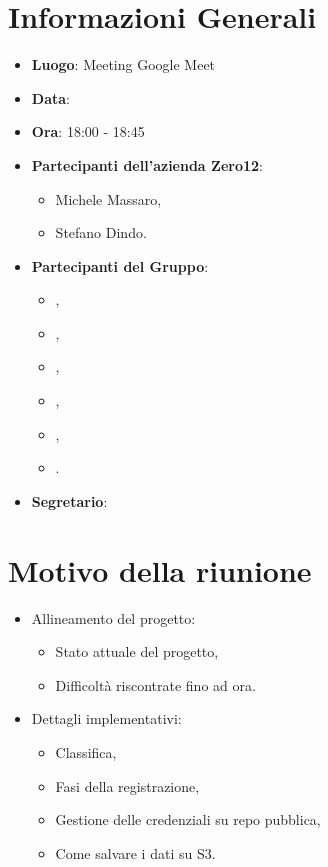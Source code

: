 \section{Informazioni Generali}

\begin{itemize}
\item{\textbf{Luogo}}: Meeting Google Meet
\item{\textbf{Data}}: \D{}
\item{\textbf{Ora}}: 18:00 - 18:45
\item{\textbf{Partecipanti dell'azienda Zero12}}: 
	\begin{itemize}
	\item{Michele Massaro,} 
	\item{Stefano Dindo.}
	\end{itemize} 
\item{\textbf{Partecipanti del Gruppo}}: 
	\begin{itemize}
	\item{\EP{},} 
	\item{\FP{},}
	\item{\GC{},}
	\item{\LW{},}	
	\item{\MB{},}
	\item{\PV{}.}
	\end{itemize} 
\item{\textbf{Segretario}}: \GC{}
\end{itemize}

\section{Motivo della riunione}
\begin{itemize}
	\item{Allineamento del progetto:}
	\begin{itemize}
		\item {Stato attuale del progetto,}
		\item {Difficoltà riscontrate fino ad ora.}
	\end{itemize}
		\item {Dettagli implementativi:}
		\begin{itemize}
			\item {Classifica,}
			\item {Fasi della registrazione,}
			\item {Gestione delle credenziali su repo pubblica,}
			\item {Come salvare i dati su S3.}
		\end{itemize}
\end{itemize}

